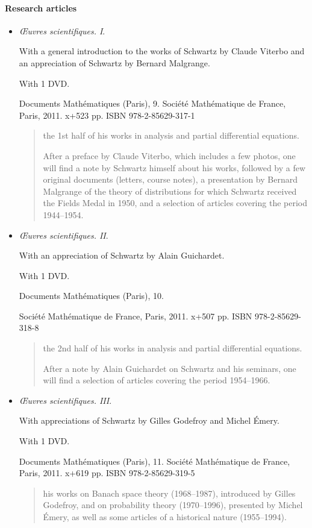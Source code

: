 \documentclass{article}
\begin{document}
\paragraph{Research articles}
\begin{itemize}
	\item \textit{Œuvres scientifiques. I}.
	
	With a general introduction to the works of Schwartz by Claude Viterbo and an appreciation of Schwartz by Bernard Malgrange.
	
	With 1 DVD.
	
	Documents Mathématiques (Paris), 9. Société Mathématique de France, Paris, 2011. x+523 pp. ISBN 978-2-85629-317-1
	\begin{quotation}
		the 1st half of his works in analysis and partial differential equations.
		
		After a preface by Claude Viterbo, which includes a few photos, one will find a note by Schwartz himself about his works, followed by a few original documents (letters, course notes), a presentation by Bernard Malgrange of the theory of distributions for which Schwartz received the Fields Medal in 1950, and a selection of articles covering the period 1944--1954.
	\end{quotation}
	\item \textit{Œuvres scientifiques. II}.
	
	With an appreciation of Schwartz by Alain Guichardet.
	
	With 1 DVD.
	
	Documents Mathématiques (Paris), 10.
	
	Société Mathématique de France, Paris, 2011. x+507 pp. ISBN 978-2-85629-318-8
	\begin{quotation}
		the 2nd half of his works in analysis and partial differential equations.
		
		After a note by Alain Guichardet on Schwartz and his seminars, one will find a selection of articles covering the period 1954--1966.
	\end{quotation}
	\item \textit{Œuvres scientifiques. III}.
	
	With appreciations of Schwartz by Gilles Godefroy and Michel Émery.
	
	With 1 DVD.
	
	Documents Mathématiques (Paris), 11. Société Mathématique de France, Paris, 2011. x+619 pp. ISBN 978-2-85629-319-5
	\begin{quotation}
		his works on Banach space theory (1968--1987), introduced by Gilles Godefroy, and on probability theory (1970--1996), presented by Michel Émery, as well as some articles of a historical nature (1955--1994).
	\end{quotation}
\end{itemize}
\end{document}
